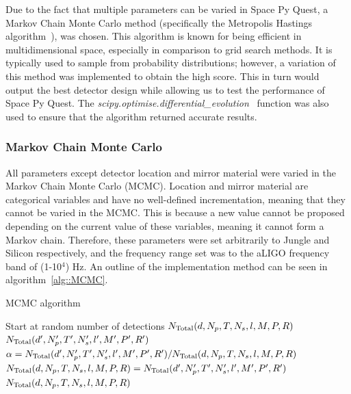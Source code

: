 \documentclass{article}
\begin{document}
Due to the fact that multiple parameters can be varied in Space Py
Quest, a Markov Chain Monte Carlo method (specifically the Metropolis
Hastings algorithm~\cite{metropolis, hastings}), was chosen. This
algorithm is known for being efficient in multidimensional space,
especially in comparison to grid search methods. It is typically used
to sample from probability distributions; however, a variation of this
method was implemented to obtain the high score. This in turn would
output the best detector design while allowing us to test the
performance of Space Py Quest. The
\textit{scipy.optimise.differential\_evolution}~\cite{scipy} function
was also used to ensure that the algorithm returned accurate results. 

\subsubsection*{Markov Chain Monte Carlo}
All parameters except detector location and mirror material were
varied in the Markov Chain Monte Carlo (MCMC). Location and mirror
material are categorical variables and have no well-defined
incrementation, meaning that they cannot be varied in the MCMC. This
is because a new value cannot be proposed depending on the current
value of these variables, meaning it cannot form a Markov
chain. Therefore, these parameters were set arbitrarily to Jungle and
Silicon respectively, and the frequency range set was to the aLIGO
frequency band of (1-10$^4$) Hz. An outline of the implementation
method can be seen in algorithm~\ref{alg::MCMC}.

\begin{algorithm}
\caption{MCMC algorithm}
\label{alg::MCMC}
\begin{algorithmic}
\item{Start at random number of detections} $N_{\rm Total}(d, N_p, T, N_s, l, M, P, R)$ 
    \State {} $N_{\rm Total}(d', N_p', T', N_s', l', M', P', R')$
    \State $\alpha = N_{\rm Total}(d', N_p', T', N_s', l', M', P', R')/N_{\rm Total}(d, N_p, T, N_s, l, M, P, R)$
    \State $N_{\rm Total}(d, N_p, T, N_s, l, M, P, R) = N_{\rm Total}(d', N_p', T', N_s', l', M', P', R')$
    \EndIf
    \State {} $N_{\rm Total}(d, N_p, T, N_s, l, M, P, R)$
\EndFor
\end{algorithmic}
\end{algorithm}
\end{document}
